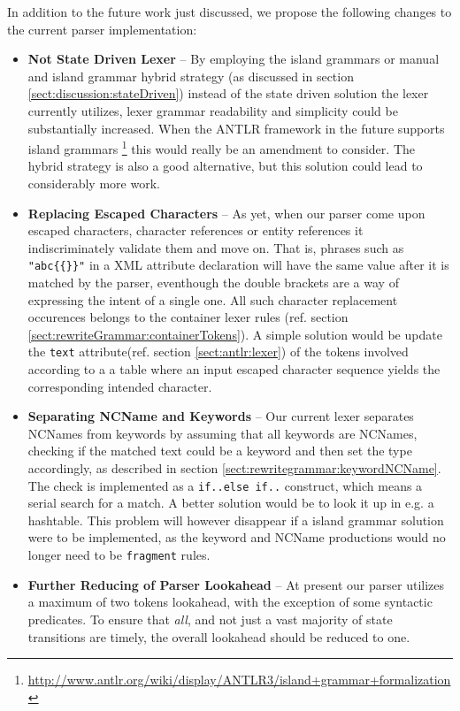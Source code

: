 In addition to the future work just discussed, we propose the following changes
to the current parser implementation:
\begin{itemize}
\item \textbf{Not State Driven Lexer} -- By employing the island grammars or
manual and island grammar hybrid strategy (as discussed in section
\ref{sect:discussion:stateDriven}) instead of the state driven solution the
lexer currently utilizes, lexer grammar readability and simplicity could be
substantially increased. When the ANTLR framework in the future supports island
grammars
\footnote{\url{http://www.antlr.org/wiki/display/ANTLR3/island+grammar+formalization}}
this would really be an amendment to consider. The hybrid strategy is also a
good alternative, but this solution could lead to considerably more
work.

\item \textbf{Replacing Escaped Characters} -- As yet, when our parser come
upon escaped characters, character references or entity references it
indiscriminately validate them and move on. That is, phrases such as
\verb!"abc{{}}"! in a XML attribute declaration will have the same value after
it is matched by the parser, eventhough the double brackets are a way of
expressing the intent of a single one. All such character replacement
occurences belongs to the container lexer rules (ref. section
\ref{sect:rewriteGrammar:containerTokens}). A simple solution would be update
the \verb!text! attribute(ref. section \ref{sect:antlr:lexer}) of the tokens
involved according to a a table where an input escaped character sequence
yields the corresponding intended character.

\item \textbf{Separating NCName and Keywords} -- Our current lexer separates
NCNames from keywords by assuming that all keywords are NCNames, checking if
the matched text could be a keyword and then set the type accordingly, as
described in section \ref{sect:rewritegrammar:keywordNCName}. The check is
implemented as a \verb!if..else if..! construct, which means a serial search
for a match. A better solution would be to look it up in e.g. a hashtable. This
problem will however disappear if a island grammar solution were to be
implemented, as the keyword and NCName productions would no longer need to be
\verb!fragment! rules.

\item \textbf{Further Reducing of Parser Lookahead} -- At present our parser utilizes a maximum of two tokens lookahead, with the exception of some syntactic predicates. To ensure that \emph{all}, and not just a vast majority of state transitions are timely, the overall lookahead should be reduced to one.


\end{itemize}
